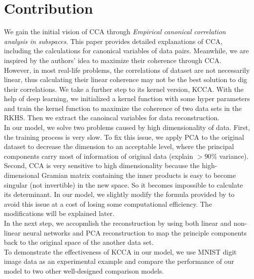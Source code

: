 \documentclass[12pt]{report} %
\begin{document}
\section{Contribution}
We gain the initial vision of CCA through \textit{Empirical canonical correlation analysis in subspaces}\cite{ECCA}. This paper provides detailed explanations of CCA, including the calculations for canonical variables of data pairs. Meanwhile, we are inspired by the authors' idea to maximize their coherence through CCA. However, in most real-life problems, the correlations of dataset are not necessarily linear, thus calculating their linear coherence may not be the best solution to dig their correlations. We take a further step to its kernel version, KCCA. With the help of deep learning, we initialized a kernel function with some hyper parameters and train the kernel function to maximize the coherence of two data sets in the RKHS. Then we extract the canoincal variables for data reconstruction.\\
In our model, we solve two problems caused by high dimensionality of data. First, the training process is very slow. To fix this issue, we apply PCA to the original dataset to decrease the dimension to an acceptable level, where the principal components carry most of information of original data (explain $>90\%$ variance). Second, CCA is very sensitive to high dimensionality because the high-dimensional Gramian matrix\cite{GM} containing the inner products is easy to become singular (not invertible)\cite{SM} in the new space. So it becomes impossible to calculate its determinant. In our model, we slightly modify the formula provided by \cite{ECCA} to avoid this issue at a cost of losing some computational efficiency. The modifications will be explained later. \\
In the next step, we accopmlish the reconstruction by using both linear and non-linear neural networks and PCA reconstruction to map the principle components back to the original space of the another data set. \\
To demonstrate the effectiveness of KCCA in our model, we use MNIST digit image data as an experimental example and compare the performance of our model to two other well-designed comparison models.
\end{document}
